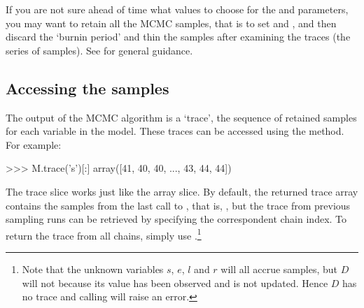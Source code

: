 \documentclass[]{jss}
\begin{document}
If you are not sure ahead of time what values to choose for the  and  parameters, you may want to retain all the MCMC samples, that is to set  and , and then discard the `burnin period' and thin the samples after examining the traces (the series of samples). See \citet{gelman} for general guidance.

\subsection{Accessing the samples}
The output of the MCMC algorithm is a `trace', the sequence of retained
samples for each variable in the model. These traces can be accessed
using the  method. For example:
\begin{CodeInput}
>>> M.trace('s')[:]
array([41, 40, 40, ..., 43, 44, 44])
\end{CodeInput}
The trace slice  works just like the  array
slice. By default, the returned trace array contains the samples from the
last call to , that is, , but the trace from
previous sampling runs can be retrieved by specifying the correspondent
chain index. To return the trace from all chains, simply use
.\footnote{Note that the unknown variables $s$, $e$, $l$ and $r$ will all
accrue samples, but $D$ will not because its value has been observed and is
not updated. Hence $D$ has no trace and calling  will
raise an error. }

\end{document}
